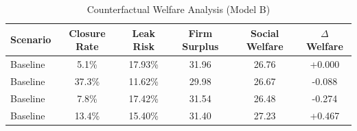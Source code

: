 \begin{table}[ht]
\centering
\begin{tabular}{lccccc}
  \toprule
Scenario & Closure Rate & Leak Risk & Firm Surplus & Social Welfare & $\Delta$ Welfare \\ 
  \midrule
Baseline & 5.1\% & 17.93\% & 31.96 & 26.76 & +0.000 \\ 
  Baseline & 37.3\% & 11.62\% & 29.98 & 26.67 & -0.088 \\ 
  Baseline & 7.8\% & 17.42\% & 31.54 & 26.48 & -0.274 \\ 
  Baseline & 13.4\% & 15.40\% & 31.40 & 27.23 & +0.467 \\ 
   \bottomrule
\end{tabular}
\caption{Counterfactual Welfare Analysis (Model B)} 
\label{tab:welfare_cf}
\end{table}

